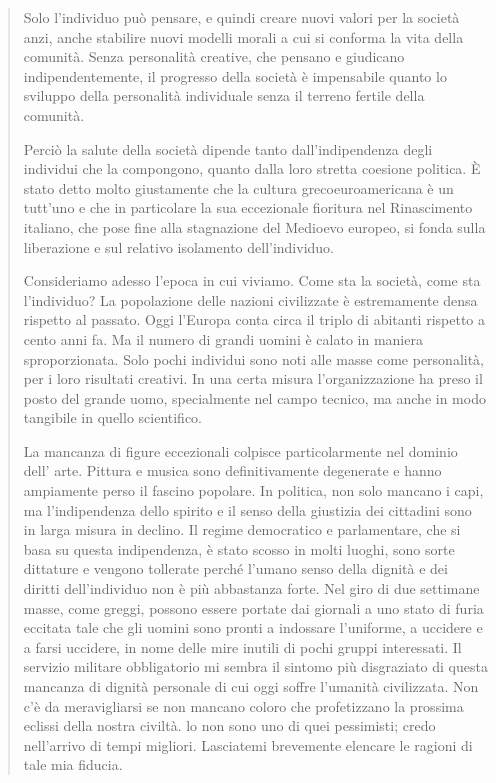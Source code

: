\documentclass[a4paper, oneside]{article}
\newcounter{i}%
\newcounter{n}%
\newcounter{I}%
\begin{document}
\begin{quotation}
Solo l'individuo può pensare, e quindi creare nuovi valori per la società anzi, anche stabilire nuovi modelli morali a cui si conforma la vita della comunità. Senza personalità creative, che pensano e giudicano indipendentemente, il progresso della società è impensabile quanto lo sviluppo della personalità individuale senza il terreno fertile della comunità.

Perciò la salute della società dipende tanto dall'indipendenza degli individui che la compongono, quanto dalla loro stretta coesione politica. È stato detto molto giustamente che  la cultura grecoeuroamericana è un tutt'uno e che in particolare la sua eccezionale fioritura nel Rinascimento italiano, che pose fine alla stagnazione del Medioevo europeo, si fonda sulla liberazione e sul relativo isolamento dell'individuo.

Consideriamo adesso l'epoca in cui viviamo. Come sta la società, come sta l'individuo? La popolazione delle nazioni civilizzate è estremamente densa rispetto al passato. Oggi l'Europa conta circa il triplo di abitanti rispetto a cento anni fa. Ma il numero di grandi uomini è calato in maniera sproporzionata. Solo pochi individui sono noti alle masse come personalità, per i loro risultati creativi. In una certa misura l'organizzazione ha preso il posto del grande uomo, specialmente nel campo tecnico, ma anche in modo tangibile in quello scientifico.

La mancanza di figure eccezionali colpisce particolarmente nel dominio dell' arte. Pittura e musica sono definitivamente degenerate e hanno ampiamente perso il fascino popolare. In politica, non solo mancano i capi, ma l'indipendenza dello spirito e il senso della giustizia dei cittadini sono in larga misura in declino. Il regime democratico e parlamentare, che si basa su questa indipendenza, è stato scosso in molti luoghi, sono sorte dittature e vengono tollerate perché l'umano senso della dignità e dei diritti dell'individuo non è più abbastanza forte. Nel giro di due settimane masse, come greggi, possono essere portate dai giornali a uno stato di furia eccitata tale che gli uomini sono pronti a indossare l'uniforme, a uccidere e a farsi uccidere, in nome delle mire inutili di pochi gruppi interessati. Il servizio militare obbligatorio mi sembra il sintomo più disgraziato di questa mancanza di dignità personale di cui oggi soffre l'umanità civilizzata. Non c'è da meravigliarsi se non mancano coloro che profetizzano la prossima eclissi della nostra civiltà. lo non sono uno di quei pessimisti; credo nell'arrivo di tempi migliori. Lasciatemi brevemente elencare le ragioni di tale mia fiducia.


\end{quotation}
\end{document}
